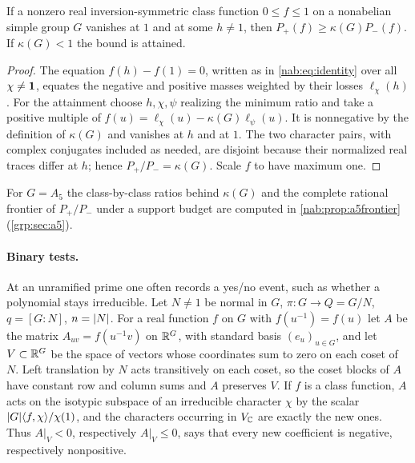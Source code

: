 \begin{proposition}[\stU]\label{nab:prop:kappa}
If a nonzero real inversion-symmetric class function $0\le f\le1$ on a nonabelian simple
group $G$ vanishes at $1$ and at some $h\ne1$, then $P_+(f)\ge\kappa(G)P_-(f)$. If
$\kappa(G)<1$ the bound is attained.
\end{proposition}
\begin{proof}
The equation $f(h)-f(1)=0$, written as in \eqref{nab:eq:identity} over all
$\chi\ne\mathbf{1}$, equates the negative and positive masses weighted by their losses
$\ell_\chi(h)$. For the attainment choose $h,\chi,\psi$ realizing the minimum ratio and
take a positive multiple of $f(u)=\ell_\chi(u)-\kappa(G)\ell_\psi(u)$. It is nonnegative by
the definition of $\kappa(G)$ and vanishes at $h$ and at $1$. The two character pairs,
with complex conjugates included as needed, are disjoint because their normalized real
traces differ at $h$; hence $P_+/P_-=\kappa(G)$. Scale $f$ to have maximum one.
\end{proof}

For $G=A_5$ the class-by-class ratios behind $\kappa(G)$ and the complete rational frontier of
$P_+/P_-$ under a support budget are computed in \cref{nab:prop:a5frontier}
(\cref{grp:sec:a5}).

\paragraph{Binary tests.}
At an unramified prime one often records a yes/no event, such as whether a polynomial
stays irreducible. Let $N\ne1$ be normal in $G$, $\pi:G\to Q=G/N$, $q=[G:N]$, $n=\lvert N\rvert$.
For a real function $f$ on $G$ with $f(u^{-1})=f(u)$ let $A$ be the matrix
$A_{uv}=f(u^{-1}v)$ on $\mathbb{R}^G$, with standard basis $(e_u)_{u\in G}$, and let
$V\subset\mathbb{R}^G$ be the space of vectors whose coordinates sum to zero on each coset of $N$. Left translation by $N$ acts transitively on
each coset, so the coset blocks of $A$ have constant row and column sums and $A$ preserves
$V$. If $f$ is a class function, $A$ acts on the isotypic subspace of an irreducible
character $\chi$ by the scalar $\lvert G\rvert\langle f,\chi\rangle/\chi(1)$, and the characters
occurring in $V_{\mathbb{C}}$ are exactly the new ones. Thus $A|_V<0$, respectively $A|_V\le0$, says
that every new coefficient is negative, respectively nonpositive.

